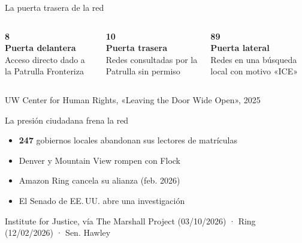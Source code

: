 \documentclass[aspectratio=169,12pt]{beamer}
\newcommand{\fuente}[1]{\vfill{\small\color{gris}#1\par}}
\begin{document}
\begin{frame}{La puerta trasera de la red}
  \begin{columns}[T]
      \begin{center}
        {\color{azul}\fontsize{44}{48}\selectfont\bfseries 8}\\[0.2cm]
        {\large\bfseries Puerta delantera}\\[0.1cm]
        {\large Acceso directo dado a la Patrulla Fronteriza}
      \end{center}
      \begin{center}
        {\color{terra}\fontsize{44}{48}\selectfont\bfseries 10}\\[0.2cm]
        {\large\bfseries Puerta trasera}\\[0.1cm]
        {\large Redes consultadas por la Patrulla sin permiso}
      \end{center}
      \begin{center}
        {\color{azul}\fontsize{44}{48}\selectfont\bfseries 89}\\[0.2cm]
        {\large\bfseries Puerta lateral}\\[0.1cm]
        {\large Redes en una búsqueda local con motivo «ICE»}
      \end{center}
  \end{columns}
  \fuente{UW Center for Human Rights, «Leaving the Door Wide Open», 2025}
\end{frame}

\begin{frame}{La presión ciudadana frena la red}
  \begin{itemize}
    \item \alert{\textbf{247}} gobiernos locales abandonan sus lectores de matrículas
    \item Denver y Mountain View rompen con Flock
    \item Amazon Ring cancela su alianza (feb. 2026)
    \item El Senado de EE.\,UU. abre una investigación
  \end{itemize}
  \fuente{Institute for Justice, vía The Marshall Project (03/10/2026) · Ring (12/02/2026) · Sen. Hawley}
\end{frame}
\end{document}

